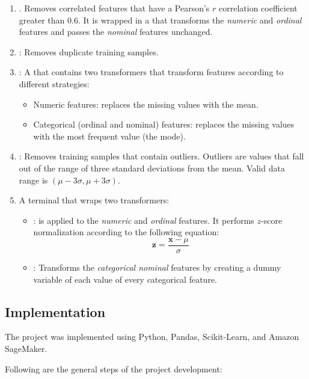\documentclass[a4paper]{article}
\begin{document}
{\begin{enumerate}
    \item {}. Removes correlated features that have a Pearson's $r$ correlation coefficient greater than $0.6$.
      It is wrapped in a  that transforms the \emph{numeric} and \emph{ordinal} features and passes the \emph{nominal} features unchanged.
    \item {}: Removes duplicate training samples.
    \item {}: A  that contains two  transformers that transform features according to different strategies:
      \begin{itemize}
      \item Numeric features: replaces the missing values with the mean.
      \item Categorical (ordinal and nominal) features: replaces the missing values with the most frequent value (the mode).
      \end{itemize}
    \item {}: Removes training samples that contain outliers. Outliers are values that fall out of the range of three standard deviations from the mean. Valid data range is $(\mu - 3\sigma, \mu + 3\sigma)$.
    \item A terminal  that wraps two transformers:
      \begin{itemize}
      \item {}: is applied to the \emph{numeric} and \emph{ordinal} features. It performs $z$-score normalization according to the following equation:
        $$\mathbf{z} = \frac{\mathbf{x}-\mu}{\sigma}$$
      \item {}: Transforms the \emph{categorical nominal} features by creating a dummy variable of each value of every categorical feature.
      \end{itemize}
    \end{enumerate}

    \subsection{Implementation}

    The project was implemented using Python, Pandas, Scikit-Learn, and Amazon SageMaker.

    Following are the general steps of the project development:

}
\end{document}
